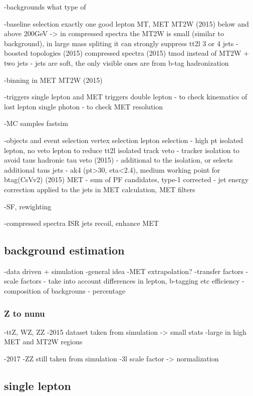 -backgrounds 
	what type of

-baseline selection
	exactly one good lepton
	MT, MET
	MT2W (2015) below and above 200GeV -> in compressed spectra the MT2W is small (similar to background), in large mass spliting it can strongly suppress tt2l
	3 or 4 jets - boosted topologies (2015)
        compressed spectra (2015) tmod instead of MT2W + two jets - jets are soft, the only visible ones are from b-tag hadronization

-binning in
	MET
	MT2W (2015)
	
-triggers
	single lepton and MET triggers
	double lepton - to check kinematics of lost lepton
	single photon - to check MET resolution

-MC samples
	fastsim

-objects and event selection
	vertex selection 
	lepton selection - high pt isolated lepton, no veto lepton to reduce tt2l
	isolated track veto - tracker isolation to avoid taus
	hadronic tau veto (2015) - additional to the isolation, or selects additional taus
	jets - ak4 (pt>30, eta<2.4), medium working point for btag(CsVv2) (2015)
	MET - sum of PF candidates, type-1 corrected - jet energy correction applied to the jets in MET calculation, MET filters

-SF, rewighting

-compressed spectra
	ISR jets
	recoil, enhance MET

\subsection{background estimation}

-data driven + simulation
-general idea
-MET extrapolation?
-transfer factors
-scale factors - take into account differences in lepton, b-tagging etc efficiency
-composition of backgrouns - percentage

\subsubsection{Z to nunu}

-ttZ, WZ, ZZ
-2015 dataset taken from simulation -> small stats
-large in high MET and MT2W regions

-2017
-ZZ still taken from simulation
-3l scale factor -> normalization

\subsection{single lepton}

